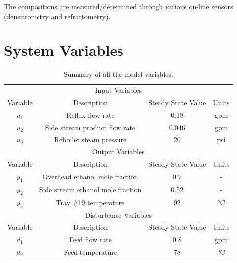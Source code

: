 \documentclass[a4paper,12pt]{article}
\begin{document}
The compositions are measured/determined through various on-line sensors (densitrometry and refractometry).    

\newpage
\section{System Variables}

\begin{table}[h]
	\label{teb:Variables}
	\centering
	\caption{Summary of all the model variables.}
	\begin{tabular}{cccc}
		\hline
		\multicolumn{4}{c}{Input Variables}                                       \\
		
		Variable & Description                       & Steady State Value & Units \\
		\hline
		$u_1$       & Reflux flow rate                  & 0.18               & gpm   \\
		$u_2$       & Side stream product flow rate     & 0.046              & gpm   \\
		$u_3$       & Reboiler steam pressure           & 20                 & psi   \\
		\hline
		\multicolumn{4}{c}{Output Variables}                                      \\
		
		Variable & Description                       & Steady State Value & Units \\
		\hline
		$y_1$       & Overhead ethanol mole fraction    & 0.7                & -     \\
		$y_2$       & Side stream ethanol mole fraction & 0.52               & -     \\
		$y_3$       & Tray \#19 temperature             & 92                 & \si{\celsius} \\
		\hline
		\multicolumn{4}{c}{Disturbance Variables}                                 \\
		
		Variable & Description                       & Steady State Value & Units \\
		\hline
		$d_1$       & Feed flow rate                    & 0.8                & gpm   \\
		$d_2$       & Feed temperature                  & 78                 & \si{\celsius} \\\hline
	\end{tabular}
\end{table}
\end{document}
